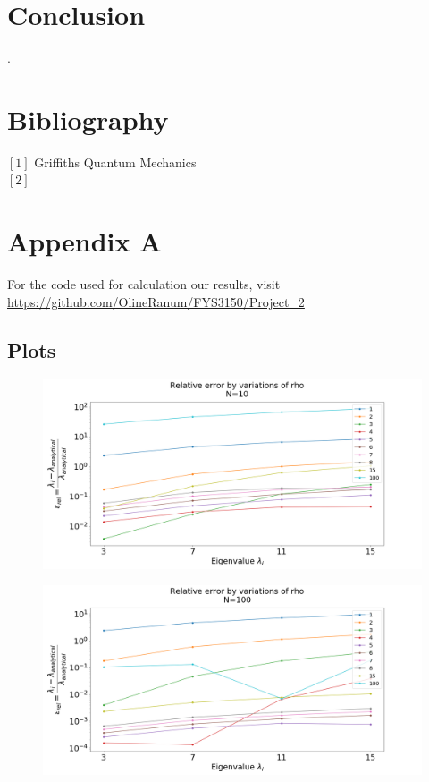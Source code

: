 \documentclass[%
reprint,
amsmath,amssymb,
aps,
]{revtex4-1}
\begin{document}
\section*{Conclusion}


\newpage .
\newpage 
\onecolumngrid
\section*{Bibliography}
\noindent $[1]$ Griffiths Quantum Mechanics\\ 
$[2]$
\section*{Appendix A}
For the code used for calculation our results, visit
\url{https://github.com/OlineRanum/FYS3150/Project_2}
\newpage 
\subsection{Plots}
\begin{figure}[!h]
	\includegraphics[scale = 0.3]{N_10_relative_error.png}
	\caption{\label{fig:2D10}}
\end{figure}
\begin{figure}[!h]
	\includegraphics[scale = 0.3]{N_100_relative_error.png}
	\caption{\label{fig:2D100}}
\end{figure}
\end{document}
